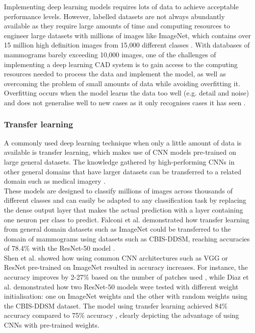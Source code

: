 Implementing deep learning models requires lots of data to achieve acceptable performance levels. However, labelled datasets are not always abundantly available as they require large amounts of time and computing resources to engineer large datasets with millions of images \citep{Krizhevsky2012} like ImageNet, which contains over 15 million high definition images from 15,000 different classes \citep{Deng2010}. With databases of mammograms barely exceeding 10,000 images, one of the challenges of implementing a deep learning CAD system is to gain access to the computing resources needed to process the data and implement the model, as well as overcoming the problem of small amounts of data while avoiding overfitting it. Overfitting occurs when the model learns the data too well (e.g. detail and noise) and does not generalise well to new cases as it only recognises cases it has seen \citep{dietterich1995overfitting}.

\subsubsection{Transfer learning}
\label{sec:litreview-transfer-learning}

A commonly used deep learning technique when only a little amount of data is available is transfer learning, which makes use of CNN models pre-trained on large general datasets. The knowledge gathered by high-performing CNNs in other general domains that have larger datasets can be transferred to a related domain such as medical imagery \citep{Falconi2019}.\\

These models are designed to classify millions of images across thousands of different classes and can easily be adapted to any classification task by replacing the dense output layer that makes the actual prediction with a layer containing one neuron per class to predict. Falconi et al. demonstrated how transfer learning from general domain datasets such as ImageNet could be transferred to the domain of mammograms using datasets  such as CBIS-DDSM, reaching accuracies of 78.4\% with the ResNet-50 model \citep{Falconi2019}.\\

Shen et al. showed how using common CNN architectures such as VGG or ResNet pre-trained on ImageNet resulted in accuracy increases. For instance, the accuracy improves by 2-27\% based on the number of patches used \citep{Shen2017}, while Diaz et al. demonstrated how two ResNet-50 models were tested with different weight initialisation: one on ImageNet weights and the other with random weights using the CBIS-DDSM dataset. The model using transfer learning achieved  84\% accuracy compared to 75\% accuracy \citep{Diaz2018}, clearly depicting the advantage of using CNNs with pre-trained weights. 

